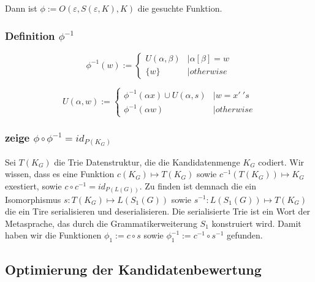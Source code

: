 \documentclass[]{article}
\begin{document}
Dann ist $\phi := O( \varepsilon, S(\varepsilon, K), K)$ die gesuchte Funktion.


\subsubsection*{Definition $\phi^{-1}$}

\[ 
  \phi^{-1}(w) := 
  \begin{cases}
    U(\alpha, \beta) &| \alpha [ \beta ] = w \\
    \{ w \}   &| otherwise
  \end{cases}
\] 

\[ 
  U( \alpha, w ):= 
  \begin{cases}
    \phi^{-1}(\alpha x) \cup U(\alpha,s) &| w = x '\ ' s \\
    \phi^{-1}(\alpha w) &|otherwise
  \end{cases}
\] 

\subsubsection*{zeige $\phi\circ\phi^{-1} = id_{P(K_G)}$}

Sei $T(K_G)$ die Trie Datenstruktur, die die Kandidatenmenge $K_G$ codiert.
Wir wissen, dass es eine Funktion $c(K_G)\mapsto T(K_G)$ sowie $c^{-1}(T(K_G)) \mapsto K_G$ exestiert, sowie $c\circ c^{-1} = id_{P(L(G))}$. Zu finden ist demnach die ein Isomorphismus $s: T(K_G) \mapsto L(S_1(G))$ sowie $s^{-1}: L(S_1(G)) \mapsto T(K_G)$ die ein Tire serialisieren und deserialisieren. Die serialisierte Trie ist ein Wort der Metasprache, das durch die Grammatikerweiterung $S_1$ konstruiert wird. Damit haben wir die Funktionen $\phi_1 := c \circ s$ sowie $\phi_1^{-1} := c^{-1} \circ s^{-1}$ gefunden. 
  

\subsection{Optimierung der Kandidatenbewertung}
\end{document}
